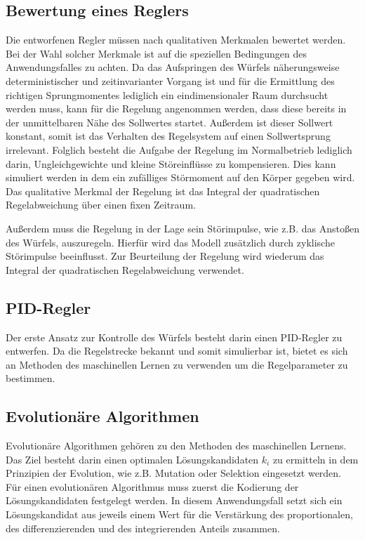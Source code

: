 \documentclass{article}
\begin{document}
\subsection*{Bewertung eines Reglers}
Die entworfenen Regler müssen nach qualitativen Merkmalen bewertet werden. Bei der Wahl solcher Merkmale ist auf die speziellen Bedingungen des Anwendungsfalles zu achten. Da das Aufspringen des Würfels näherungsweise deterministischer und zeitinvarianter Vorgang ist und für die Ermittlung des richtigen Sprungmomentes lediglich ein eindimensionaler Raum durchsucht werden muss, kann für die Regelung angenommen werden, dass diese bereits in der unmittelbaren Nähe des Sollwertes startet. Außerdem ist dieser Sollwert konstant, somit ist das Verhalten des Regelsystem auf einen Sollwertsprung irrelevant. Folglich besteht die Aufgabe der Regelung im Normalbetrieb lediglich darin, Ungleichgewichte und kleine Störeinflüsse zu kompensieren. Dies kann simuliert werden in dem ein zufälliges Störmoment auf den Körper gegeben wird. Das qualitative Merkmal der Regelung ist das Integral der quadratischen Regelabweichung über einen fixen Zeitraum.

Außerdem muss die Regelung in der Lage sein Störimpulse, wie z.B. das Anstoßen des Würfels, auszuregeln. Hierfür wird das Modell zusätzlich durch zyklische Störimpulse beeinflusst. Zur Beurteilung der Regelung wird wiederum das Integral der quadratischen Regelabweichung verwendet.

\newpage
\subsection*{PID-Regler}
Der erste Ansatz zur Kontrolle des Würfels besteht darin einen PID-Regler zu entwerfen. Da die Regelstrecke bekannt und somit simulierbar ist, bietet es sich an Methoden des maschinellen Lernen zu verwenden um die Regelparameter zu bestimmen.

\subsection*{Evolutionäre Algorithmen}
Evolutionäre Algorithmen gehören zu den Methoden des maschinellen Lernens. Das Ziel besteht darin einen optimalen  Lösungskandidaten $k_i$ zu ermitteln in dem Prinzipien der Evolution, wie z.B. Mutation oder Selektion eingesetzt werden.
Für einen evolutionären Algorithmus muss zuerst die Kodierung der Lösungskandidaten festgelegt werden. In diesem Anwendungsfall setzt sich ein Lösungskandidat aus jeweils einem Wert für die Verstärkung des proportionalen, des differenzierenden und des integrierenden Anteils zusammen.
\end{document}

